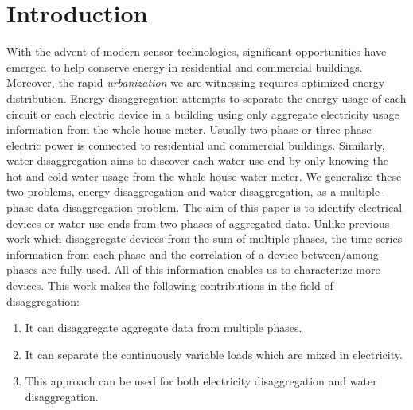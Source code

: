 \section{Introduction}
With the advent of modern sensor technologies, 
significant opportunities have emerged to help conserve energy in 
residential and commercial buildings. Moreover, the rapid \emph{urbanization} we are witnessing requires optimized energy distribution. 
Energy disaggregation attempts to 
separate the energy usage 
of each circuit or each electric device in a building 
using only aggregate electricity usage information from 
the whole house meter. 
Usually two-phase or three-phase electric power is 
connected to residential and commercial buildings. 
Similarly, water disaggregation aims to discover each 
water use end by only knowing the 
hot and cold water usage from the whole house water meter.
We generalize these two problems, energy disaggregation and 
water disaggregation, as a multiple-phase data disaggregation problem. 
The aim of this paper is to identify electrical devices or water use ends from 
two phases of aggregated data. 
Unlike previous work which disaggregate devices
from the sum of multiple phases, 
the time series information from each phase and the correlation of a device between/among phases 
are fully used.  
All of this information enables us to characterize more devices. 
This work makes the following contributions in the field of disaggregation:
\begin{enumerate}
\item It can disaggregate aggregate data from multiple phases.
\item It can separate the continuously variable loads which are mixed in electricity. 
\item This approach can be used for both electricity disaggregation and water disaggregation.
\end{enumerate}


